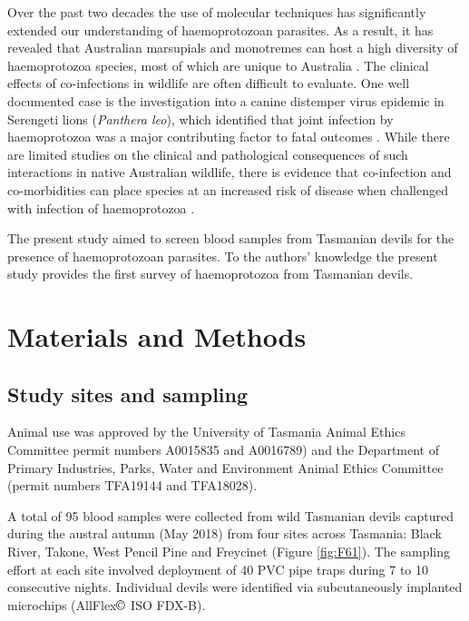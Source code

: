 \documentclass[a4paper, nobind]{templates/ociamthesis}
\begin{document}
Over the past two decades the use of molecular techniques has significantly extended our understanding of haemoprotozoan parasites. As a result, it has revealed that Australian marsupials and monotremes can host a high diversity of haemoprotozoa species, most of which are unique to Australia \autocite{thompsonTrypanosomesAustralianMammals2014,austenInvestigationMorphologicalDiversity2015,barbosaSequenceAnalysesMitochondrial2019,northoverIncreasedTrypanosomaSpp2019}. The clinical effects of co-infections in wildlife are often difficult to evaluate. One well documented case is the investigation into a canine distemper virus epidemic in Serengeti lions (\emph{Panthera leo}), which identified that joint infection by haemoprotozoa was a major contributing factor to fatal outcomes \autocite{munsonClimateExtremesPromote2008}. While there are limited studies on the clinical and pathological consequences of such interactions in native Australian wildlife, there is evidence that co-infection and co-morbidities can place species at an increased risk of disease when challenged with infection of haemoprotozoa \autocite{mcinnesPotentialImpactNative2011,boteroTrypanosomesGeneticDiversity2013,thompsonTemporalSpatialDynamics2014}.

The present study aimed to screen blood samples from Tasmanian devils for the presence of haemoprotozoan parasites. To the authors' knowledge the present study provides the first survey of haemoprotozoa from Tasmanian devils.

\hypertarget{materials-and-methods}{%
\section{Materials and Methods}\label{materials-and-methods}}

\hypertarget{study-sites-and-sampling}{%
\subsection{Study sites and sampling}\label{study-sites-and-sampling}}

Animal use was approved by the University of Tasmania Animal Ethics Committee permit numbers A0015835 and A0016789) and the Department of Primary Industries, Parks, Water and Environment Animal Ethics Committee (permit numbers TFA19144 and TFA18028).

A total of 95 blood samples were collected from wild Tasmanian devils captured during the austral autumn (May 2018) from four sites across Tasmania: Black River, Takone, West Pencil Pine and Freycinet (Figure \ref{fig:F61}). The sampling effort at each site involved deployment of 40 PVC pipe traps during 7 to 10 consecutive nights. Individual devils were identified via subcutaneously implanted microchips (AllFlex\(\copyright\) ISO FDX-B).
\end{document}
